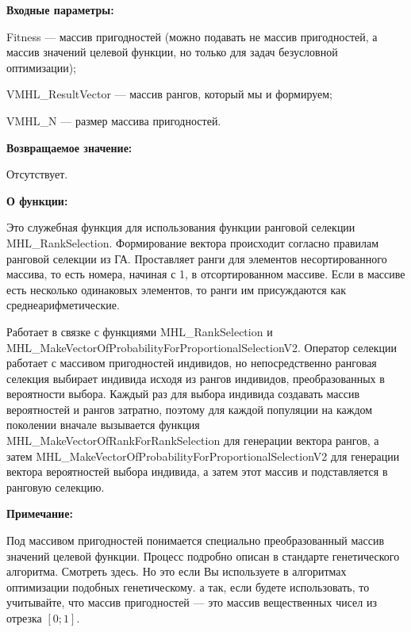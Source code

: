 \textbf{Входные параметры:}

Fitness --- массив пригодностей (можно подавать не массив пригодностей, а массив значений целевой функции, но только для задач безусловной оптимизации);
 
VMHL\_ResultVector --- массив рангов, который мы и формируем;
 
VMHL\_N --- размер массива пригодностей.

\textbf{Возвращаемое значение:} 
 
Отсутствует.
 
\textbf{О функции:}

Это служебная функция для использования функции ранговой селекции MHL\_RankSelection. Формирование вектора происходит согласно правилам ранговой селекции из ГА. Проставляет ранги для элементов несортированного массива, то есть номера, начиная с 1, в отсортированном массиве. Если в массиве есть несколько одинаковых элементов, то ранги им присуждаются как среднеарифметические.

Работает в связке с функциями MHL\_RankSelection и MHL\_MakeVectorOfProbabilityForProportionalSelectionV2. Оператор селекции работает с массивом пригодностей индивидов, но непосредственно ранговая селекция выбирает индивида исходя из рангов индивидов, преобразованных в вероятности выбора. Каждый раз для выбора индивида создавать массив вероятностей и рангов затратно, поэтому для каждой популяции на каждом поколении вначале вызывается функция MHL\_MakeVectorOfRankForRankSelection для генерации вектора рангов, а затем MHL\_MakeVectorOfProbabilityForProportionalSelectionV2 для генерации вектора вероятностей выбора индивида, а затем этот массив и подставляется в ранговую селекцию.

\textbf{Примечание:}

 Под массивом пригодностей понимается специально преобразованный массив значений целевой функции. Процесс подробно описан в стандарте генетического алгоритма. Смотреть здесь. Но это если Вы используете в алгоритмах оптимизации подобных генетическому. а так, если будете использовать, то учитывайте, что массив пригодностей --- это массив вещественных чисел из отрезка $[0;1]$.
